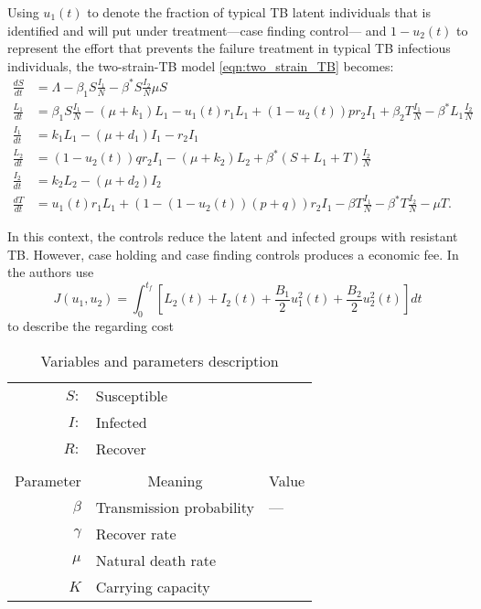 	Using $u_1(t)$ to denote the fraction of typical TB latent individuals that 
is identified and will put under treatment---case finding control--- and
$1 - u_2(t)$ to represent the effort that prevents the failure treatment in 
typical TB infectious individuals, the two-strain-TB model 
\eqref{eqn:two_strain_TB} becomes:
\begin{equation}
	  \begin{aligned}
	    \frac{dS}{dt} &=
		    \Lambda - \beta_1 S \frac{I_1}{N} 
		    - \beta^{*} S \frac{I_2}{N}
		    \mu S
		  \\
		  \frac{L_1}{dt} &=
			  \beta_1 S \frac{I_1}{N}
			  - (\mu + k_1) L_1
			  - u_1 (t) r_1 L_1
			  + (1 - u_2 (t)) p r_2 I_1
				+ \beta_2 T \frac{I_1}{N}
				- \beta^{*} L_1 \frac{I_2}{N}
			\\
			\frac{I_1}{dt} &= 
				k_1 L_1
				- (\mu + d_1) I_1
				-r_2 I_1
			\\
			\frac{L_2}{dt} &=
				(1 - u_2(t)) q r_2 I_1
				- (\mu + k_2) L_2
				+ \beta^{*} (S + L_1 + T) \frac{I_2}{N}
			\\
			\frac{I_2}{dt} &=
				k_2 L_2 - (\mu + d_2) I_2
			\\
			\frac{d T}{dt} &=
				u_1(t) r_1 L_1
				+ (1 - (1 - u_2(t))(p + q)) r_2 I_1
				- \beta T \frac{I_1}{N}
				- \beta^{*} T \frac{I_2}{N}
				-\mu T.
	  \end{aligned}
	\end{equation}

In this context, the controls reduce the latent and infected 
groups with resistant TB. However, case holding and case finding controls 
produces a economic fee. In \cite{Lenhart2002} the authors use
\begin{equation}
	 J(u_1, u_2) =
		 \int_0^{t_f}
			 \left[
				 L_2(t) + I_2(t) 
				 + \frac{B_1}{2} u_1 ^ 2(t)
				 + \frac{B_2}{2} u_2 ^ 2(t)
			 \right]dt
\end{equation}
to describe the regarding cost 

\begin{table}
	\begin{center}
		\begin{tabular}{@{}rll@{}} 
			$S:$
			&
				Susceptible
			\\
			$I:$ 
			&	Infected
			\\
			$R:$ 
			&	Recover
			\\
			\\
			\multicolumn{1}{c}{Parameter}
			&
			\multicolumn{1}{c}{Meaning}
			& 
			\multicolumn{1}{c}{Value}
			\\
				\midrule
				$\beta$
				& 
					Transmission probability
				&
					---
			\\
				$\gamma$
				&
					Recover rate
			\\
				$\mu$
				&
					Natural death rate
			\\
				$K$
				&
					Carrying capacity
			\\
			\bottomrule
		\end{tabular}
		\caption{Variables and parameters description}
	\end{center}
\end{table}